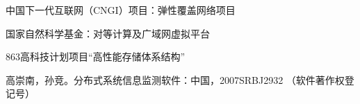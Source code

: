 \begin{resume}
\begin{enumerate}[{[}1{]}]
  \end{enumerate}

  \begin{enumerate}[{[}1{]}]

  \item 中国下一代互联网（CNGI）项目：弹性覆盖网络项目

  \item 国家自然科学基金：对等计算及广域网虚拟平台

  \item 863高科技计划项目“高性能存储体系结构”

  \end{enumerate}

  \begin{enumerate}[{[}1{]}]

  \item 高崇南，孙竞。分布式系统信息监测软件：中国，2007SRBJ2932
  （软件著作权登记号）

  \end{enumerate}
\end{resume}
